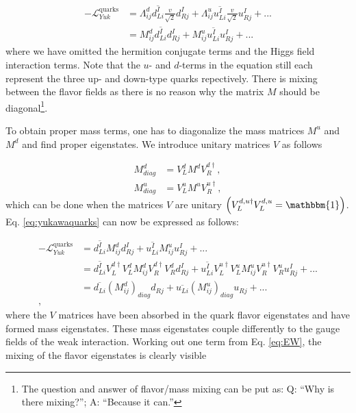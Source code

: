 \begin{equation}
\label{eq:yukawaquarks}
\begin{split}
-\mathcal{L}^{\textrm{quarks}}_{Yuk} &= \Lambda^d_{ij}\overline{d^I_{Li}} \frac{v}{\sqrt{2}}d^I_{Rj} + \Lambda^u_{ij} \overline{u^I_{Li}} \frac{v}{\sqrt{2}} u^I_{Rj} + ...\\
&= M^d_{ij} \overline{d^I_{Li}} d^I_{Rj} + M^u_{ij} \overline{u^I_{Li}} u^I_{Rj} + ...
\end{split}
\end{equation}
where we have omitted the hermition conjugate terms and the Higgs field interaction terms. Note that the $u$- and $d$-terms in the equation still each represent the three up- and down-type quarks repectively. There is mixing between the flavor fields as there is no reason why the matrix $M$ should be diagonal\footnote{The question and answer of flavor/mass mixing can be put as: Q: ``Why is there mixing?''; A: ``Because it can.''}.

To obtain proper mass terms, one has to diagonalize the mass matrices $M^u$ and $M^d$ and find proper eigenstates. We introduce unitary matrices $V$ as follows

\begin{equation}
\begin{split}
M^d_{diag} &= V^d_L M^d V^{d\dagger}_R,\\
M^u_{diag} &= V^u_L M^u V^{u\dagger}_R,
\end{split}
\end{equation}
which can be done when the matrices $V$ are unitary $\left(V^{d,u\dagger}_L V^{d,u}_L = \mathbbm{1}\right)$. Eq. \ref{eq:yukawaquarks} can now be expressed as follows:

\begin{equation}
\begin{split}
-\mathcal{L}^{\textrm{quarks}}_{Yuk} &= \overline{d^I_{Li}} M^d_{ij} d^I_{Rj} + \overline{u^I_{Li}} M^u_{ij} u^I_{Rj} + ...\\
&= \overline{d^I_{Li}} V^{d\dagger}_L V^d_L M^d_{ij} V^{d\dagger}_R V^{d}_R d^I_{Rj} + \overline{u^I_{Li}} V^{u\dagger}_L V^u_L M^u_{ij} V^{u\dagger}_R V^u_R u^I_{Rj} + ...\\
&= \overline{d_{Li}} \left(M^d_{ij}\right)_{diag} d_{Rj} + \overline{u_{Li}} \left(M^u_{ij}\right)_{diag} u_{Rj} + ... \\,
\end{split}
\end{equation}
where the $V$ matrices have been absorbed in the quark flavor eigenstates and have formed mass eigenstates. These mass eigenstates couple differently to the gauge fields of the weak interaction. Working out one term from Eq. \ref{eq:EW}, the mixing of the flavor eigenstates is clearly visible

